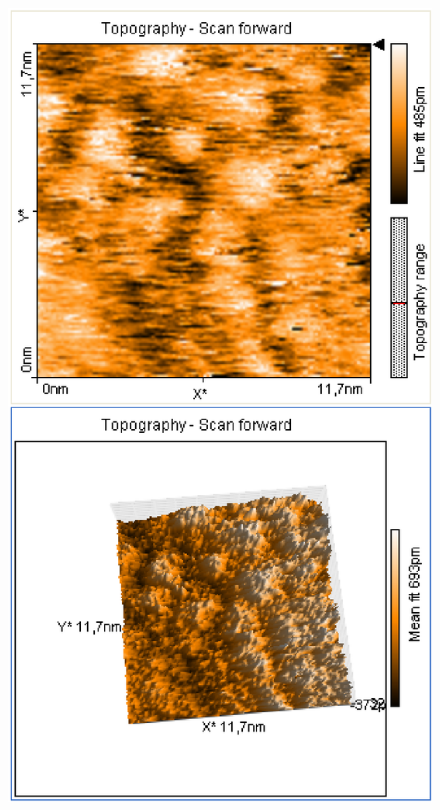 \documentclass[12pt]{article}
\begin{document}
\begin{figure}[H]  
\begin{minipage}{0.4\linewidth}
\centering
\includegraphics[width=0.9\linewidth]{../plot/data/mos2/mos24.eps}
\end{minipage}
\begin{minipage}{0.2\linewidth}
\centering
\end{minipage}
\begin{minipage}{0.4\linewidth}
\centering

\end{minipage}
\end{figure}
\end{document}
